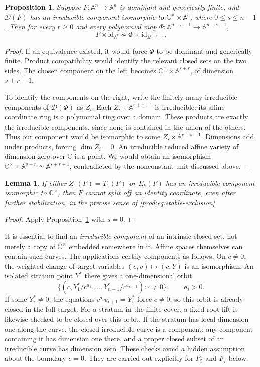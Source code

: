 \documentclass[11pt]{article}
\numberwithin{equation}{section}
\theoremstyle{plain}
\newtheorem{proposition}[theorem]{Proposition}
\newtheorem{lemma}[theorem]{Lemma}
\theoremstyle{definition}
\theoremstyle{remark}
\newcommand{\C}{\mathbb{C}}
\newcommand{\A}{\mathbb{A}}
\newcommand{\id}{\mathrm{id}}
\begin{document}
\begin{proposition}\label{prod:prop:general-component}
Suppose $F:\A^n\to\A^n$ is dominant and generically finite, and
$\mathcal D(F)$ has an irreducible component isomorphic to
$\C^\times\times\A^s$, where $0\leq s\leq n-1$.
Then for every $r\geq0$ and every polynomial map
$\Phi:\A^{n-s-1}\to\A^{n-s-1}$,
\[
 F\times\id_{\A^r}\nsim\Phi\times\id_{\A^{r+s+1}}.
\]
\end{proposition}
\begin{proof}
If an equivalence existed, it would force $\Phi$ to be dominant and
generically finite. Product compatibility would identify the relevant
closed sets on the two sides. The chosen component on the left becomes
$\C^\times\times\A^{s+r}$, of dimension $s+r+1$.

To identify the components on the right, write the finitely many irreducible
components of $\mathcal D(\Phi)$ as $Z_i$. Each
$Z_i\times\A^{r+s+1}$ is irreducible: its affine coordinate ring is a
polynomial ring over a domain. These products are exactly the irreducible
components, since none is contained in the union of the others. Thus our
component would be isomorphic to some $Z_i\times\A^{r+s+1}$. Dimensions
add under products, forcing $\dim Z_i=0$. An irreducible reduced affine
variety of dimension zero over $\C$ is a point. We would obtain an
isomorphism
$\C^\times\times\A^{s+r}\simeq\A^{s+r+1}$, contradicted by the
nonconstant unit discussed above.
\end{proof}

\begin{lemma}\label{prod:lem:finite-obstruction}
If either $Z_1(F)=\overline{T_1(F)}$ or $E_k(F)$ has an irreducible
component isomorphic to $\C^\times$, then $F$ cannot split off an identity
coordinate, even after further stabilization, in the precise sense of
\eqref{prod:eq:stable-exclusion}.
\end{lemma}
\begin{proof}
Apply Proposition~\ref{prod:prop:general-component} with $s=0$.
\end{proof}

It is essential to find an \emph{irreducible component} of an intrinsic
closed set, not merely a copy of $\C^\times$ embedded somewhere in it.
Affine spaces themselves can contain such curves. The applications certify
components as follows. On $c\ne0$, the weighted change of target variables
$(c,v)\mapsto(c,Y)$ is an isomorphism. An isolated stratum point $Y^*$
there gives a one-dimensional orbit
\[
 \{(c,Y_1^*/c^{a_1},\ldots,Y_{n-1}^*/c^{a_{n-1}}):c\ne0\},
 \qquad a_i>0.
\]
If some $Y_i^*\ne0$, the equations $c^{a_i}v_{i+1}=Y_i^*$ force
$c\ne0$, so this orbit is already closed in the full target. For a stratum
in the finite cover, a fixed-root lift is likewise checked to be closed
over this orbit. If the stratum has local dimension one along the curve,
the closed irreducible curve is a component: any component containing it
has dimension one there, and a proper closed subset of an irreducible curve
has dimension zero. These checks avoid a hidden assumption about the boundary
$c=0$. They are carried out explicitly for $F_5$ and $F_7$ below.
\end{document}
